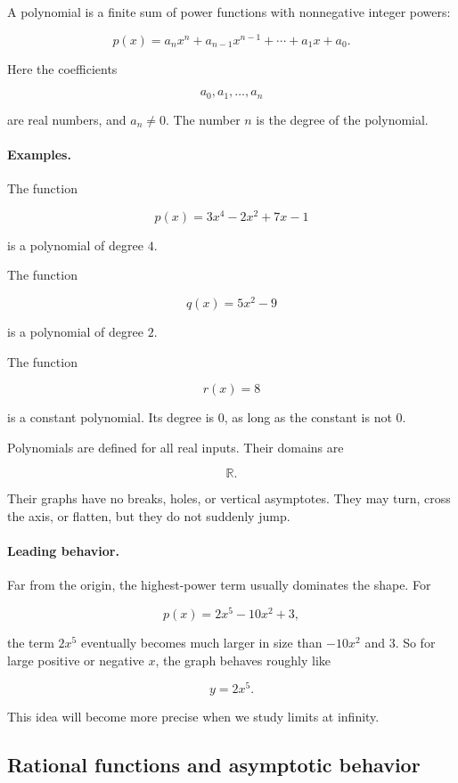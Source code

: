 A polynomial is a finite sum of power functions with nonnegative integer powers:

\[
p(x)=a_nx^n+a_{n-1}x^{n-1}+\cdots+a_1x+a_0.
\]

Here the coefficients

\[
a_0,a_1,\ldots,a_n
\]

are real numbers, and \(a_n\neq 0\). The number \(n\) is the degree of the polynomial.

\paragraph{Examples.}
The function

\[
p(x)=3x^4-2x^2+7x-1
\]

is a polynomial of degree \(4\).

The function

\[
q(x)=5x^2-9
\]

is a polynomial of degree \(2\).

The function

\[
r(x)=8
\]

is a constant polynomial. Its degree is \(0\), as long as the constant is not \(0\).

Polynomials are defined for all real inputs. Their domains are

\[
\mathbb R.
\]

Their graphs have no breaks, holes, or vertical asymptotes. They may turn, cross the axis, or flatten, but they do not suddenly jump.

\paragraph{Leading behavior.}
Far from the origin, the highest-power term usually dominates the shape. For

\[
p(x)=2x^5-10x^2+3,
\]

the term \(2x^5\) eventually becomes much larger in size than \(-10x^2\) and \(3\). So for large positive or negative \(x\), the graph behaves roughly like

\[
y=2x^5.
\]

This idea will become more precise when we study limits at infinity.

\subsection{Rational functions and asymptotic behavior}
\label{subsec:rational-functions-asymptotic}

